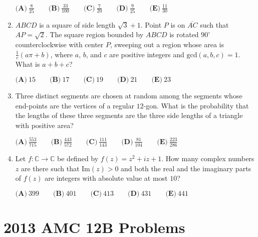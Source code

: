 \documentclass{article}
\begin{document}
\begin{enumerate}[label=\arabic*., itemsep=0.5em]
\( \textbf{(A)} \ \frac{8}{25} \qquad \textbf{(B)} \ \frac{33}{100} \qquad \textbf{(C)} \ \frac{7}{20} \qquad \textbf{(D)} \ \frac{9}{25} \qquad \textbf{(E)} \ \frac{11}{30}\)\par \vspace{0.5em}\item \( ABCD\) is a square of side length \( \sqrt{3} + 1 \). Point \( P \) is on \( \overline{AC} \) such that \( AP = \sqrt{2} \). The square region bounded by \( ABCD \) is rotated \( 90^{\circ} \) counterclockwise with center \( P \), sweeping out a region whose area is \( \frac{1}{c} (a \pi + b) \), where \(a \), \(b\), and \( c \) are positive integers and \( \text{gcd}(a,b,c) = 1 \). What is \( a + b + c \)?

\(\textbf{(A)} \ 15 \qquad \textbf{(B)} \ 17 \qquad \textbf{(C)} \ 19 \qquad \textbf{(D)} \ 21 \qquad \textbf{(E)} \ 23 \)\par \vspace{0.5em}\item Three distinct segments are chosen at random among the segments whose end-points are the vertices of a regular \(12\)-gon. What is the probability that the lengths of these three segments are the three side lengths of a triangle with positive area?

\( \textbf{(A)} \ \frac{553}{715} \qquad \textbf{(B)} \ \frac{443}{572} \qquad \textbf{(C)} \ \frac{111}{143} \qquad \textbf{(D)} \ \frac{81}{104} \qquad \textbf{(E)} \ \frac{223}{286}\)\par \vspace{0.5em}\item Let \(f : \mathbb{C} \to \mathbb{C} \) be defined by \( f(z) = z^2 + iz + 1 \). How many complex numbers \(z \) are there such that \( \text{Im}(z) > 0 \) and both the real and the imaginary parts of \(f(z)\) are integers with absolute value at most \( 10 \)?

\( \textbf{(A)} \ 399 \qquad \textbf{(B)} \ 401 \qquad \textbf{(C)} \ 413 \qquad \textbf{(D)} \ 431 \qquad \textbf{(E)} \ 441 \)\par \vspace{0.5em}
\end{enumerate}
\newpage\section*{2013 AMC 12B Problems}
\end{document}
